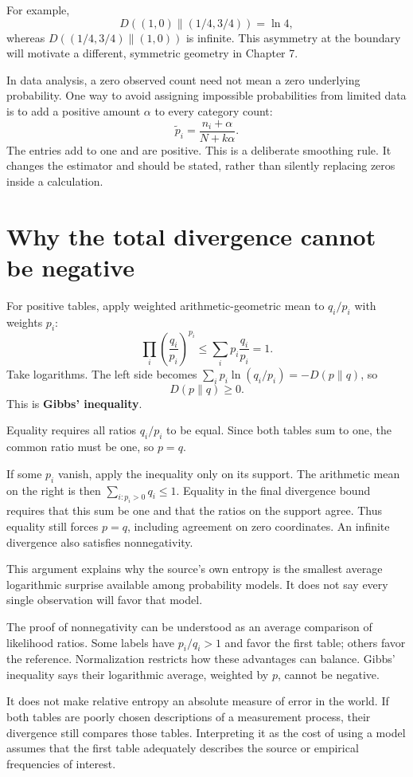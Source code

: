 \documentclass[11pt,oneside,openany]{book}
\theoremstyle{definition}
\theoremstyle{remark}
\numberwithin{equation}{chapter}
\begin{document}
For example, \[D((1,0)\|(1/4,3/4))=\ln4,\] whereas \(D((1/4,3/4)\|(1,0))\) is infinite. This asymmetry at the boundary will motivate a different, symmetric geometry in Chapter 7.

In data analysis, a zero observed count need not mean a zero underlying probability. One way to avoid assigning impossible probabilities from limited data is to add a positive amount \(\alpha\) to every category count: \[\widetilde p_i=\frac{n_i+\alpha}{N+k\alpha}.\] The entries add to one and are positive. This is a deliberate smoothing rule. It changes the estimator and should be stated, rather than silently replacing zeros inside a calculation.

\section{Why the total divergence cannot be negative}\label{ch06-why-the-total-divergence-cannot-be-negative}

For positive tables, apply weighted arithmetic-geometric mean to \(q_i/p_i\) with weights \(p_i\): \[\prod_i\left(\frac{q_i}{p_i}\right)^{p_i}
\leq\sum_i p_i\frac{q_i}{p_i}=1.\] Take logarithms. The left side becomes \(\sum_i p_i\ln(q_i/p_i)=-D(p\|q)\), so \[\boxed{D(p\|q)\geq0.}\] This is \textbf{Gibbs' inequality}.

Equality requires all ratios \(q_i/p_i\) to be equal. Since both tables sum to one, the common ratio must be one, so \(p=q\).

If some \(p_i\) vanish, apply the inequality only on its support. The arithmetic mean on the right is then \(\sum_{i:p_i>0}q_i\leq1\). Equality in the final divergence bound requires that this sum be one and that the ratios on the support agree. Thus equality still forces \(p=q\), including agreement on zero coordinates. An infinite divergence also satisfies nonnegativity.

This argument explains why the source's own entropy is the smallest average logarithmic surprise available among probability models. It does not say every single observation will favor that model.

The proof of nonnegativity can be understood as an average comparison of likelihood ratios. Some labels have \(p_i/q_i>1\) and favor the first table; others favor the reference. Normalization restricts how these advantages can balance. Gibbs' inequality says their logarithmic average, weighted by \(p\), cannot be negative.

It does not make relative entropy an absolute measure of error in the world. If both tables are poorly chosen descriptions of a measurement process, their divergence still compares those tables. Interpreting it as the cost of using a model assumes that the first table adequately describes the source or empirical frequencies of interest.
\end{document}
